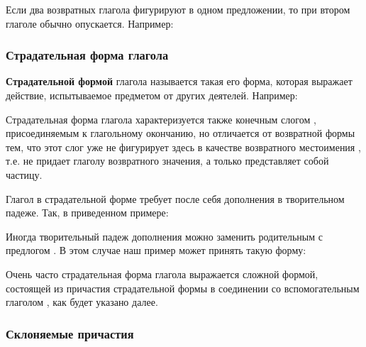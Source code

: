 \documentclass[11pt,a4paper,oneside]{memoir}
\begin{document}
    
    \medskip{}

    Если два возвратных глагола фигурируют в одном предложении, то при втором глаголе {} обычно опускается. Например:

    \medskip{}

                \subsubsection{Страдательная форма глагола}

    \textbf{Страдательной формой} глагола называется такая его форма, которая выражает действие, испытываемое предметом от других деятелей. Например:
    
    \bigskip{}

    Страдательная форма глагола характеризуется также конечным слогом {}, присоединяемым к глагольному окончанию, но отличается от возвратной формы тем, что этот слог {} уже не фигурирует здесь в качестве возвратного местоимения {}, т.е. не придает глаголу возвратного значения, а только представляет собой частицу.
    
    Глагол в страдательной форме требует после себя дополнения в творительном падеже. Так, в приведенном примере:
    
    \medskip{}
    
    Иногда творительный падеж дополнения можно заменить родительным с предлогом {}. В этом случае наш пример может принять такую форму:
    
    \bigskip{}
    
    Очень часто страдательная форма глагола выражается сложной формой, состоящей из причастия страдательной формы в соединении со вспомогательным глаголом {}, как будет указано далее.

                \subsubsection{Склоняемые причастия}
\end{document}
